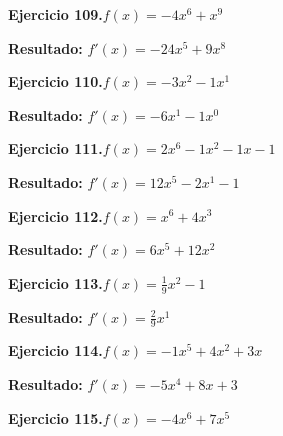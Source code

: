 \documentclass[10pt,a4paper]{article}
\begin{document}
\newpage
\begin{ejbox}
\textbf{Ejercicio 109.}\quad $f(x) = -4x^{6} + x^{9}$
\end{ejbox}

\begin{solbox}
\textbf{Resultado:} \(\displaystyle f'(x) = -24x^{5} + 9x^{8}\)
\end{solbox}

\begin{ejbox}
\textbf{Ejercicio 110.}\quad $f(x) = -3x^{2} -1x^{1}$
\end{ejbox}

\begin{solbox}
\textbf{Resultado:} \(\displaystyle f'(x) = -6x^{1} -1x^{0}\)
\end{solbox}

\begin{ejbox}
\textbf{Ejercicio 111.}\quad $f(x) = 2x^{6} -1x^{2} -1x -1$
\end{ejbox}

\begin{solbox}
\textbf{Resultado:} \(\displaystyle f'(x) = 12x^{5} -2x^{1} -1\)
\end{solbox}

\newpage
\begin{ejbox}
\textbf{Ejercicio 112.}\quad $f(x) = x^{6} +4x^{3}$
\end{ejbox}

\begin{solbox}
\textbf{Resultado:} \(\displaystyle f'(x) = 6x^{5} +12x^{2}\)
\end{solbox}

\begin{ejbox}
\textbf{Ejercicio 113.}\quad $f(x) = \frac{1}{9}x^{2} -1$
\end{ejbox}

\begin{solbox}
\textbf{Resultado:} \(\displaystyle f'(x) = \frac{2}{9}x^{1}\)
\end{solbox}

\begin{ejbox}
\textbf{Ejercicio 114.}\quad $f(x) = -1x^{5} +4x^2 +3x$
\end{ejbox}

\begin{solbox}
\textbf{Resultado:} \(\displaystyle f'(x) = -5x^{4} +8x +3\)
\end{solbox}

\newpage
\begin{ejbox}
\textbf{Ejercicio 115.}\quad $f(x) = -4x^{6} + 7x^{5}$
\end{ejbox}
\end{document}
